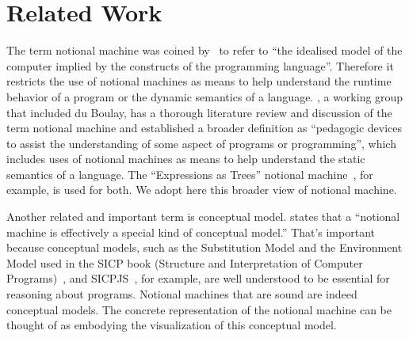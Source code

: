 
\section{Related Work}
\label{sec:RelatedWork}


The term notional machine
was coined by~\citet{duboulayDifficultiesLearningProgram1986} to refer to
``the idealised model of the computer implied by the constructs of the programming language''.
Therefore it
restricts the use of notional machines as means to help understand the runtime behavior of a program or the dynamic semantics of a language.
\citet{fincherNotionalMachinesComputing2020}, a working group that included du Boulay,
has a thorough literature review and discussion of the term notional machine
and
established a broader definition
as
``pedagogic devices to assist the understanding of some aspect of programs or programming'',
which includes
uses of notional machines as means to help understand the static semantics of a language.
The ``Expressions as Trees'' notional machine~\citep{fincherNotionalMachinesComputing2020},
for example,
is used for both.
We adopt here this broader view of notional machine.

Another related and important term is conceptual model.
\citet{fincherNotionalMachinesComputing2020} states that a
``notional machine is effectively a special kind of conceptual model.''
That's important because
conceptual models,
such as the Substitution Model and the Environment Model used
in the SICP book (Structure and Interpretation of Computer Programs)~\cite{abelsonStructureInterpretationComputer1996},
and SICPJS~\cite{abelsonStructureInterpretationComputer2022},
for example,
are well understood to be essential for reasoning about programs.
Notional machines that are sound are indeed conceptual models.
The concrete representation of the notional machine
can be thought of as embodying the visualization of this conceptual model.

